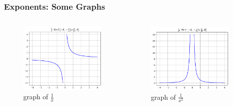 \documentclass{beamer}
\begin{document}
\begin{frame}
    \frametitle{Exponents: Some Graphs}
    \begin{columns}
      \begin{column}{0.5\textwidth}
        \begin{figure}
          \includegraphics[scale=0.4]{exponent-graph1.png}
          \caption{graph of \(\frac{1}{x}\)}
        \end{figure}
      \end{column}
      \begin{column}{0.5\textwidth}
        \begin{figure}
          \includegraphics[scale=0.4]{exponent-graph2.png}
          \caption{graph of \(\frac{1}{x^{2}}\)}
        \end{figure}
      \end{column}
    \end{columns}
\end{frame}
\end{document}
